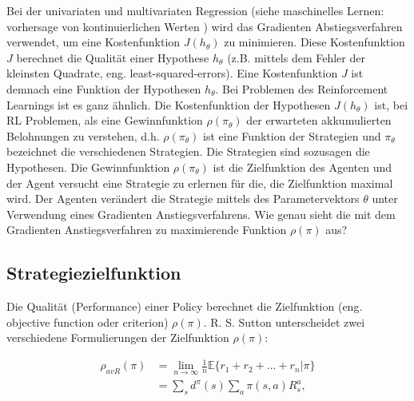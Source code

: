 \documentclass[conference]{IEEEtran}
\begin{document}
Bei der univariaten und multivariaten Regression (siehe maschinelles Lernen: vorhersage von kontinuierlichen Werten \cite{goodfellow_16}) wird das Gradienten Abstiegsverfahren verwendet, um eine Kostenfunktion $J(h_\theta)$ zu minimieren. Diese Kostenfunktion $J$ berechnet die Qualität einer Hypothese $h_\theta$ (z.B. mittels dem Fehler der kleinsten Quadrate, eng. least-squared-errors). Eine Kostenfunktion $J$ ist demnach eine Funktion der Hypothesen $h_\theta$. Bei Problemen des Reinforcement Learnings ist es ganz ähnlich. Die Kostenfunktion der Hypothesen $J(h_\theta)$ ist, bei RL Problemen, als eine Gewinnfunktion $\rho(\pi_\theta)$ der erwarteten akkumulierten Belohnungen zu verstehen, d.h. $\rho(\pi_\theta)$ ist eine Funktion der Strategien und $\pi_\theta$ bezeichnet die verschiedenen Strategien. Die Strategien sind sozusagen die Hypothesen. Die Gewinnfunktion $\rho(\pi_\theta)$ ist die Zielfunktion des Agenten und der Agent versucht eine Strategie zu erlernen für die, die Zielfunktion maximal wird. Der Agenten verändert die Strategie mittels des Parametervektors $\theta$ unter Verwendung eines Gradienten Anstiegsverfahrens. Wie genau sieht die mit dem Gradienten Anstiegsverfahren zu maximierende Funktion $\rho(\pi)$ aus?

\subsection{Strategiezielfunktion}
Die Qualität (Performance) einer Policy berechnet die Zielfunktion (eng. objective function oder criterion) $\rho(\pi)$. R. S. Sutton \cite{sutton_99} unterscheidet zwei verschiedene Formulierungen der Zielfunktion $\rho(\pi)$: 

\begin{equation*}
\begin{aligned}
\rho_{avR}(\pi) & = \lim\limits_{n \rightarrow \infty}{\frac{1}{n} \mathbb{E}\{r_1 + r_2 + ... + r_n | \pi\}} \\
& = \sum_s d^\pi (s) \sum_a \pi(s,a) R^a_s,
\end{aligned}
\end{equation*}
\end{document}
